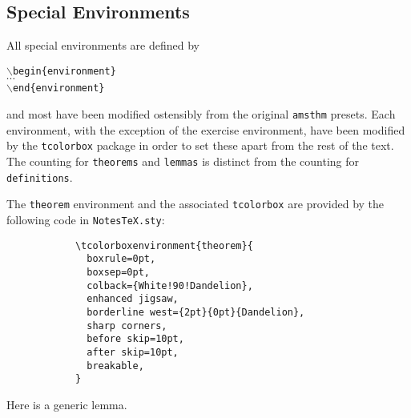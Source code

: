 \documentclass[10pt]{article}
\begin{document}
	


	\subsection{Special Environments}\label{Sub:Special}
	All special environments are defined by
	\begin{center}
	\texttt{$\backslash$begin\{environment\}}\\
	$\cdots$\\
	\texttt{$\backslash$end\{environment\}}
	\end{center}
	and most have been modified ostensibly from the original \texttt{amsthm} presets. Each environment, with the exception of the exercise environment, have been modified by the \texttt{tcolorbox} package in order to set these apart from the rest of the text. The counting for \texttt{theorems} and \texttt{lemmas} is distinct from the counting for \texttt{definitions}.
	\begin{theorem}
		The \texttt{theorem} environment and the associated \texttt{tcolorbox} are provided by the following code in \texttt{NotesTeX.sty}:
		\begin{verbatim}
			\tcolorboxenvironment{theorem}{
			  boxrule=0pt,
			  boxsep=0pt,
			  colback={White!90!Dandelion},
			  enhanced jigsaw, 
			  borderline west={2pt}{0pt}{Dandelion},
			  sharp corners,
			  before skip=10pt,
			  after skip=10pt,
			  breakable,
			}
		\end{verbatim}
	\end{theorem}
	\begin{lemma}
		Here is a generic lemma.
	\end{lemma}
\end{document}
